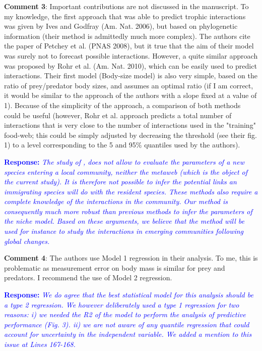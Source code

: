 \documentclass [12pt,onecolumn,twoside,openright]{report}
\begin{document}
\begin{onehalfspacing}
\medskip \textbf{Comment 3}: Important contributions are not
discussed in the manuscript. To my knowledge, the first approach that was able
to predict trophic interactions was given by Ives and Godfray (Am. Nat. 2006),
but based on phylogenetic information (their method is admittedly much more
complex). The authors cite the paper of Petchey et al. (PNAS 2008), but it true
that the aim of their model was surely not to forecast possible interactions.
However, a quite similar approach was proposed by Rohr et al. (Am. Nat. 2010),
which can be easily used to predict interactions. Their first model (Body-size
model) is also very simple, based on the ratio of prey/predator body sizes, and
assumes an optimal ratio (if I am correct, it would be similar to the approach
of the authors with a slope fixed at a value of 1). Because of the simplicity of
the approach, a comparison of both methods could be useful (however, Rohr et al.
approach predicts a total number of interactions that is very close to the
number of interactions used in the "training" food-web; this could be simply
adjusted by decreasing the threshold (see their fig. 1) to a level corresponding
to the 5 and 95\% quantiles used by the authors).

\medskip \textcolor{blue}{\textbf{Response:}} \textit{\textcolor{blue}{The study of  \textcite{Rohr2010}, does not allow to evaluate the parameters of a new species entering a local community, neither the metaweb (which is the object of the current study). It is therefore not possible to infer the potential links an immigrating species will do with the resident species. These methods also require a complete knowledge of the interactions in the community. Our method is consequently much more robust than previous methods to infer the parameters of the niche model. Based on these arguments, we believe that the method  will be used for instance to study the interactions in emerging communities following global changes.}} 
\medskip 

\medskip \textbf{Comment 4}: The authors use Model 1
regression in their analysis. To me, this is problematic as measurement error on
body mass is similar for prey and predators. I recommend the use of Model 2
regression.

\medskip \textcolor{blue}{\textbf{Response:}} \textit{\textcolor{blue}{We do agree that the best statistical model for this analysis should be a type 2 regression. We however deliberately used a type 1 regression for two reasons: i) we needed the R2 of the model to perform the analysis of predictive performance (Fig. 3). ii) we are not aware of any quantile regression that could account for uncertainty in the independent variable. We added a mention to this issue at Lines 167-168.}}
\medskip 


\end{onehalfspacing}
\end{document}
